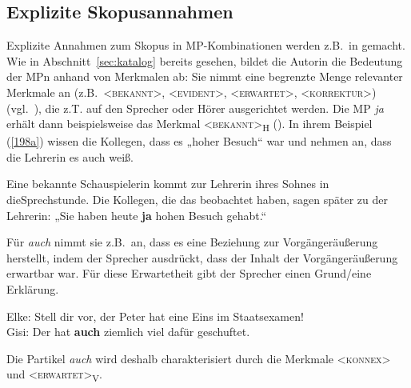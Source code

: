 \subsection{Explizite Skopusannahmen}
\label{sec:skopusexp}
Explizite Annahmen zum Skopus in MP-Kom\-bi\-na\-ti\-on\-en werden z.B.\ in \citet{Thurmair1989, Thurmair1991} gemacht. Wie in Abschnitt~\ref{sec:katalog} bereits gesehen, bildet die Autorin die Bedeutung der MPn anhand von Merkmalen  ab: Sie nimmt eine begrenzte Menge relevanter Merkmale an (z.B.\ \textless \textsc{bekannt}\textgreater, \textless \textsc{evident}\textgreater, \textless \textsc{erwartet}\textgreater, <\textsc{korrektur}>) (vgl.\ \citealt[100--101, 200]{Thurmair1989}), die z.T. auf den Sprecher oder Hörer ausgerichtet werden. Die MP \textit{ja} erhält dann beispiels\-weise das Merkmal \textless \textsc{bekannt}\textgreater\textsubscript{H} (). In ihrem Beispiel (\ref{198a}) wissen die Kollegen, dass es „hoher Besuch“ war und nehmen an, dass die Lehrerin es auch weiß.

\begin{exe}
	\ex\label{198a}{\sloppy 
	Eine bekannte Schauspielerin kommt zur Lehrerin ihres Sohnes in die\linebreak Sprechstunde. Die Kollegen, die das beobachtet haben, sagen später zu der 				Lehrerin: „Sie haben heute \textbf{ja} hohen Besuch gehabt.“}
	\hfill\hbox{\citet[104]{Thurmair1989}}
\end{exe}
Für \textit{auch} nimmt sie z.B.\ an, dass es eine Beziehung zur Vorgängeräußerung herstellt, indem der Sprecher ausdrückt, dass der Inhalt der Vorgängeräußerung erwartbar war. Für diese Erwartetheit gibt der Sprecher einen Grund/eine Er\-klärung.

\begin{exe}
	\ex\label{198} 
	Elke: Stell dir vor, der Peter hat eine Eins im Staatsexamen!\\
	Gisi: Der hat \textbf{auch} ziemlich viel dafür geschuftet.
	\hfill\hbox{\citet[155]{Thurmair1989}}
\end{exe}
Die Partikel \textit{auch} wird deshalb charakterisiert durch die Merkmale \textless\textsc{konnex}\textgreater\xspace und \textless\textrm{\textsc{erwartet}}\textgreater\textsubscript{V}.

